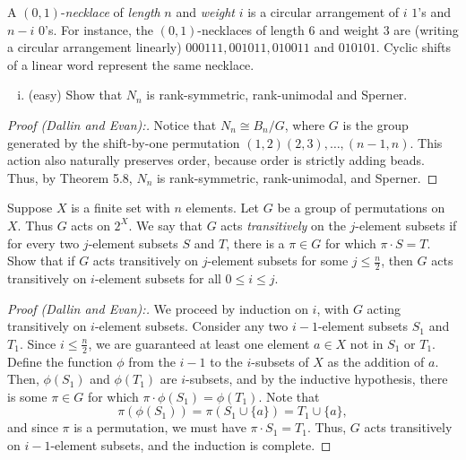 \documentclass[11pt]{scrartcl}
\begin{document}
\begin{problem}[\textcolor{red}{Binary Necklace Poset}]
    A $(0,1)$-\textit{necklace} of \textit{length} $n$ and \textit{weight} $i$ is a circular arrangement of $i$ $1$'s and $n-i$ $0$'s. For instance, the $(0,1)$-necklaces of length $6$ and weight $3$ are (writing a circular arrangement linearly) $000111, 001011, 010011$ and $010101$. Cyclic shifts of a linear word represent the same necklace.

    \begin{enumerate}[(i)]
        \item (easy) Show that $N_n$ is rank-symmetric, rank-unimodal and Sperner.
    \end{enumerate}
\end{problem}
\begin{proof}[Proof (Dallin and Evan):]
    Notice that $N_n\cong B_n/G$, where $G$ is the group generated by the shift-by-one permutation $(1,2)(2,3),\dots,(n-1,n)$. This action also naturally preserves order, because order is strictly adding beads. Thus, by Theorem 5.8, $N_n$ is rank-symmetric, rank-unimodal, and Sperner.
\end{proof}
\begin{problem}
    Suppose $X$ is a finite set with $n$ elements. Let $G$ be a group of permutations on $X$. Thus $G$ acts on $2^X$. We say that $G$ acts \textit{transitively} on the $j$-element subsets if for every two $j$-element subsets $S$ and $T$, there is a $\pi\in G$ for which $\pi\cdot S=T$. Show that if $G$ acts transitively on $j$-element subsets for some $j\leq \frac n 2$, then $G$ acts transitively on $i$-element subsets for all $0\leq i\leq j$.
\end{problem}
\begin{proof}[Proof (Dallin and Evan):]
    We proceed by induction on $i$, with $G$ acting transitively on $i$-element subsets. Consider any two $i-1$-element subsets $S_1$ and $T_1$. Since $i\leq \frac{n}{2}$, we are guaranteed at least one element $a\in X$ not in $S_1$ or $T_1$. Define the function $\phi$ from the $i-1$ to the $i$-subsets of $X$ as the addition of $a$. Then, $\phi(S_1)$ and $\phi(T_1)$ are $i$-subsets, and by the inductive hypothesis, there is some $\pi\in G$ for which $\pi\cdot \phi(S_1)=\phi(T_1)$. Note that \[\pi(\phi(S_1))=\pi(S_1\cup\{a\})=T_1\cup\{a\},\] and since $\pi$ is a permutation, we must have $\pi\cdot S_1=T_1$. Thus, $G$ acts transitively on $i-1$-element subsets, and the induction is complete.
\end{proof}
\end{document}

